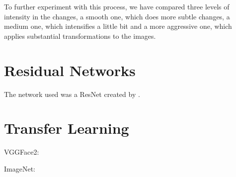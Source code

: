 To further experiment with this process, we have compared three levels of intensity in the changes, a smooth one, which does more subtle changes, a medium one, which intensifies a little bit and a more aggressive one, which applies substantial transformations to the images.

\section{Residual Networks}

The network used was a ResNet created by \cite{ParkhiVZ15}.

\section{Transfer Learning}

VGGFace2: \citep{Cao2018}

ImageNet: \citep{DengDSLL009}





